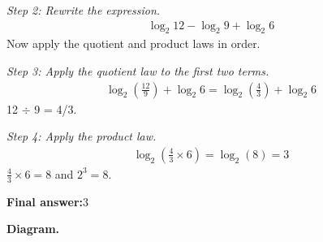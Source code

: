 \documentclass[11pt]{article}
\begin{document}
\textit{Step 2: Rewrite the expression.}
\[\begin{gathered}
\log_2 12 - \log_2 9 + \log_2 6
\end{gathered}\]
Now apply the quotient and product laws in order.

\textit{Step 3: Apply the quotient law to the first two terms.}
\[\begin{gathered}
\log_2\!\left(\frac{12}{9}\right) + \log_2 6 = \log_2\!\left(\frac{4}{3}\right) + \log_2 6
\end{gathered}\]
12 $\div$ 9 = 4/3.

\textit{Step 4: Apply the product law.}
\[\begin{gathered}
\log_2\!\left(\frac{4}{3} \times 6\right) = \log_2(8) = 3
\end{gathered}\]
\( \frac{4}{3} \times 6 = 8 \) and \( 2^3 = 8 \).

\begin{answerbox}
\textbf{Final answer:}\quad \(\displaystyle  3 \)
\end{answerbox}
\textbf{Diagram.}
\end{document}
